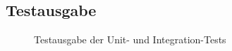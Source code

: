 \subsection{Testausgabe}
\label{subsec:Testausgabe}

\begin{figure}[htb]
\centering
{}
\caption{Testausgabe der Unit- und Integration-Tests}
\end{figure}
